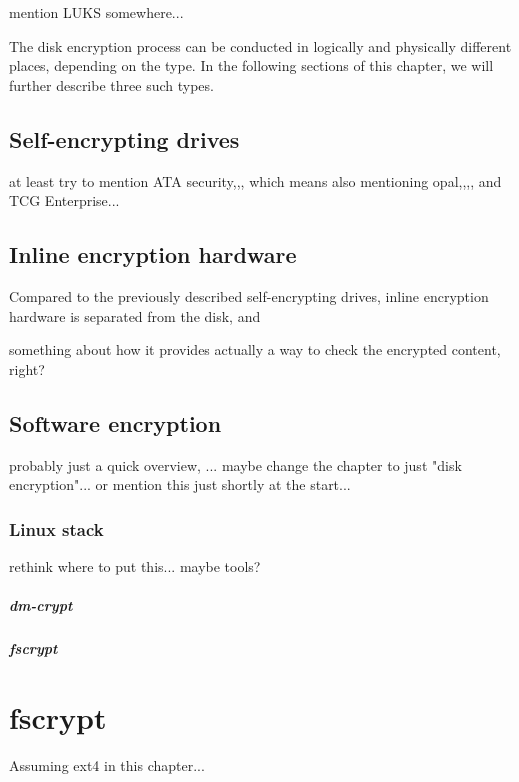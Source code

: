 \documentclass[
  digital, %
  oneside, %
  nolof,     %
  nolot,     %
]{fithesis4}
\begin{document}
mention LUKS somewhere...

The disk encryption process can be conducted in logically and physically different places, depending on the type. In the following sections of this chapter, we will further describe three such types.

\section{Self-encrypting drives}

at least try to mention ATA security,,, which means also mentioning opal,,,, and TCG Enterprise...

\section{Inline encryption hardware}

Compared to the previously described self-encrypting drives, inline encryption hardware is separated from the disk, and 

something about how it provides actually a way to check the encrypted content, right?

\section{Software encryption}

probably just a quick overview, ... maybe change the chapter to just "disk encryption"... or mention this just shortly at the start...

\subsection{Linux stack}

rethink where to put this... maybe tools?

\paragraph{dm-crypt}

\paragraph{fscrypt}

\chapter{fscrypt}

Assuming ext4 in this chapter...
\end{document}
